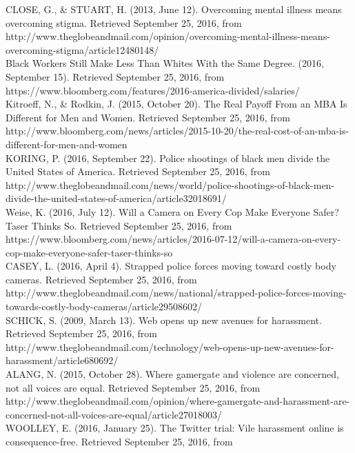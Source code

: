 \documentclass{article}
\begin{document}
\noindent
[8] CLOSE, G., \& STUART, H. (2013, June 12). Overcoming mental illness means overcoming stigma. Retrieved September 25, 2016, from \\
http://www.theglobeandmail.com/opinion/overcoming-mental-illness-means-overcoming-stigma/article12480148/\\
\noindent
[9] Black Workers Still Make Less Than Whites With the Same Degree. (2016, September 15). Retrieved September 25, 2016, from https://www.bloomberg.com/features/2016-america-divided/salaries/\\
\noindent
[10] Kitroeff, N., \& Rodkin, J. (2015, October 20). The Real Payoff From an MBA Is Different for Men and Women. Retrieved September 25, 2016, from http://www.bloomberg.com/news/articles/2015-10-20/the-real-cost-of-an-mba-is-different-for-men-and-women\\
\noindent
[11] KORING, P. (2016, September 22). Police shootings of black men divide the United States of America. Retrieved September 25, 2016, from \\
http://www.theglobeandmail.com/news/world/police-shootings-of-black-men-divide-the-united-states-of-america/article32018691/\\
\noindent
[12] Weise, K. (2016, July 12). Will a Camera on Every Cop Make Everyone Safer? Taser Thinks So. Retrieved September 25, 2016, from \\
https://www.bloomberg.com/news/articles/2016-07-12/will-a-camera-on-every-cop-make-everyone-safer-taser-thinks-so\\
\noindent
[13] CASEY, L. (2016, April 4). Strapped police forces moving toward costly body cameras. Retrieved September 25, 2016, from \\
http://www.theglobeandmail.com/news/national/strapped-police-forces-moving-towards-costly-body-cameras/article29508602/\\
\noindent
[14] SCHICK, S. (2009, March 13). Web opens up new avenues for harassment. Retrieved September 25, 2016, from http://www.theglobeandmail.com/technology/web-opens-up-new-avenues-for-harassment/article680692/\\
\noindent
[15] ALANG, N. (2015, October 28). Where gamergate and violence are concerned, not all voices are equal. Retrieved September 25, 2016, from \\
http://www.theglobeandmail.com/opinion/where-gamergate-and-harassment-are-concerned-not-all-voices-are-equal/article27018003/\\
\noindent
[16] WOOLLEY, E. (2016, January 25). The Twitter trial: Vile harassment online is consequence-free. Retrieved September 25, 2016, from \\
\end{document}
